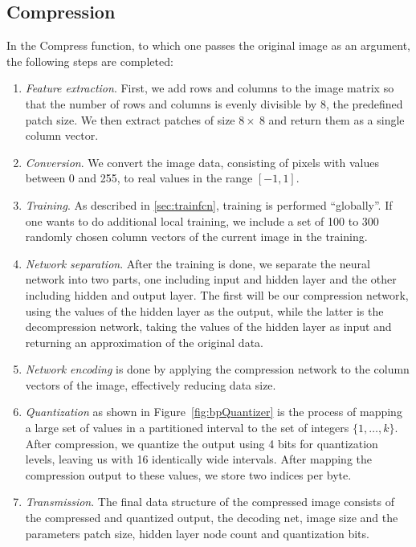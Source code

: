 \subsection{Compression} \label{sec:compress}
In the Compress function, to which one passes the original image as an argument, the following steps are completed:
\begin{enumerate}
\item \emph{Feature extraction}. First, we add rows and columns to the image matrix so that the number of rows and columns is evenly divisible by 8, the predefined patch size. We then extract patches of size \(8 \times~8\) and return them as a single column vector.

\item \emph{Conversion}. We convert the image data, consisting of pixels with values between 0 and 255, to real values in the range \([-1, 1]\). 

\item \emph{Training}. As described in \ref{sec:trainfcn}, training is performed ``globally''. If one wants to do additional local training, we include a set of 100 to 300 randomly chosen column vectors of the current image in the training.

\item \emph{Network separation}. After the training is done, we separate the neural network into two parts, one including input and hidden layer and the other including hidden and output layer. The first will be our compression network, using the values of the hidden layer as the output, while the latter is the decompression network, taking the values of the hidden layer as input and returning an approximation of the original data.

\item \emph{Network encoding} is done by applying the compression network to the column vectors of the image, effectively reducing data size.

\item \emph{Quantization} as shown in Figure~\ref{fig:bpQuantizer} is the process of mapping a large set of values in a partitioned interval to the set of integers \(\{1,\dots,k\}\). After compression, we quantize the output using 4 bits for quantization levels, leaving us with 16 identically wide intervals. After mapping the compression output to these values, we store two indices per byte.

\item \emph{Transmission}. The final data structure of the compressed image consists of the compressed and quantized output, the decoding net, image size and the parameters patch size, hidden layer node count and quantization bits.
\end{enumerate}

